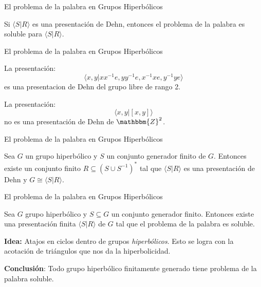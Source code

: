 \documentclass[xcolor=dvipsnames,aspectratio=159]{beamer}
\theoremstyle{largebreak}
\newcommand{\bbm}[1]{\ensuremath{\mathbbm{#1}}}
\newcommand{\gen}[1]{\ensuremath{\langle#1\rangle}}
\begin{document}
\begin{frame}{El problema de la palabra en Grupos Hiperbólicos}
    \begin{propo}
        Si $\gen{S|R}$ es una presentación de Dehn, entonces el problema de la palabra es soluble para $\gen{S|R}$.
    \end{propo}
\end{frame}

\begin{frame}{El problema de la palabra en Grupos Hiperbólicos}
    \begin{exa}
        La presentación:
        \begin{equation*}
            \gen{x,y|xx^{-1}e,yy^{-1}e,x^{-1}xe,y^{-1}ye}
        \end{equation*}
        es una presentacion de Dehn del grupo libre de rango 2.
    \end{exa}

    \pause

    \begin{exa}
        La presentación:
        \begin{equation*}
            \gen{x,y|[x,y]}
        \end{equation*}
        no es una presentación de Dehn de $\bbm{Z}^2$.
    \end{exa}
\end{frame}

\begin{frame}{El problema de la palabra en Grupos Hiperbólicos}
    \begin{theor}
        Sea $G$ un grupo hiperbólico y $S$ un conjunto generador finito de $G$. Entonces existe un conjunto finito $R\subseteq(S\cup S^{-1})^*$ tal que $\gen{S|R}$ es una presentación de Dehn y $G\cong\gen{S|R}$.
    \end{theor}
\end{frame}

\begin{frame}{El problema de la palabra en Grupos Hiperbólicos}
    \begin{cor}
        Sea $G$ grupo hiperbólico y $S\subseteq G$ un conjunto generador finito. Entonces existe una presentación finita $\gen{S|R}$ de $G$ tal que el problema de la palabra es soluble.
    \end{cor}

    \pause

    \textbf{Idea:} Atajos en ciclos dentro de grupos \textit{hiperbólicos}. Esto se logra con la acotación de triángulos que nos da la hiperbolicidad.

    \pause

    \begin{center}
        \textbf{Conclusión}: Todo grupo hiperbólico finitamente generado tiene problema de la palabra soluble.
    \end{center}
\end{frame}
\end{document}
